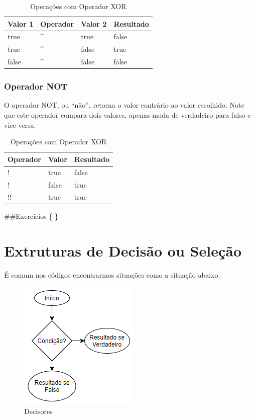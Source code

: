 \documentclass[
]{book}
\begin{document}
\begin{table}

\caption{\label{tab:unnamed-chunk-11}Operações com Operador XOR}
\centering
\begin{tabular}[t]{l|l|l|l}
\hline
Valor 1 & Operador & Valor 2 & Resultado\\
\hline
true & \textasciicircum{} & true & false\\
\hline
true & \textasciicircum{} & false & true\\
\hline
false & \textasciicircum{} & false & false\\
\hline
\end{tabular}
\end{table}

\hypertarget{operador-not}{%
\subsection{Operador NOT}\label{operador-not}}

O operador NOT, ou ``não'', retorna o valor contrário ao valor escolhido. Note que este operador compara dois valores, apenas muda de verdadeiro para falso e vice-versa.

\begin{table}

\caption{\label{tab:unnamed-chunk-12}Operações com Operador XOR}
\centering
\begin{tabular}[t]{l|l|l}
\hline
Operador & Valor & Resultado\\
\hline
! & true & false\\
\hline
! & false & true\\
\hline
!! & true & true\\
\hline
\end{tabular}
\end{table}

\#\#Exercícios \{-\}

\hypertarget{extruturas-de-decisuxe3o-ou-seleuxe7uxe3o}{%
\chapter{Extruturas de Decisão ou Seleção}\label{extruturas-de-decisuxe3o-ou-seleuxe7uxe3o}}

É comum nos códigos encontrarmos situações como a situação abaixo.

\begin{figure}
\centering
\includegraphics{imagens/decisores.png}
\caption{Decisores}
\end{figure}
\end{document}

